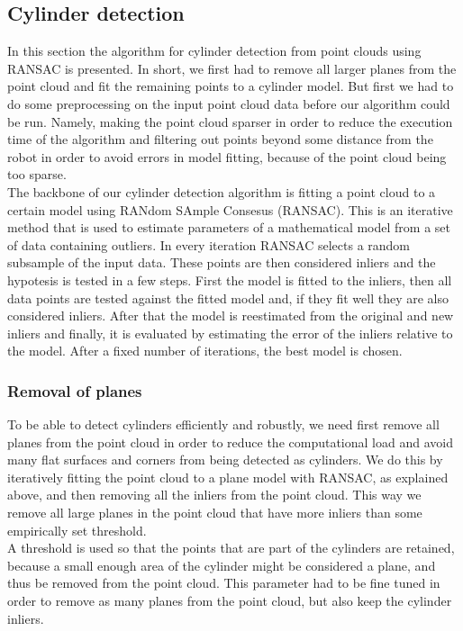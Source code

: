 \documentclass[12pt,a4paper]{article}
\begin{document}
	\subsection{Cylinder detection}
	In this section the algorithm for cylinder detection from point clouds using RANSAC is presented. In short, we first had to remove all larger planes from the point cloud and fit the remaining points to a cylinder model. But first we had to do some preprocessing on the input point cloud data before our algorithm could be run. Namely, making the point cloud sparser in order to reduce the execution time of the algorithm and filtering out points beyond some distance from the robot in order to avoid errors in model fitting, because of the point cloud being too sparse. \\

	The backbone of our cylinder detection algorithm is fitting a point cloud to a certain model using RANdom SAmple Consesus (RANSAC). This is an iterative method that is used to estimate parameters of a mathematical model from a set of data containing outliers. In every iteration RANSAC selects a random subsample of the input data. These points are then considered inliers and the hypotesis is tested in a few steps. First the model is fitted to the inliers, then all data points are tested against the fitted model and, if they fit well they are also considered inliers. After that the model is reestimated from the original and new inliers and finally, it is evaluated by estimating the error of the inliers relative to the model. After a fixed number of iterations, the best model is chosen. \\
	
	\subsubsection{Removal of planes}
	To be able to detect cylinders efficiently and robustly, we need first remove all planes from the point cloud in order to reduce the computational load and avoid many flat surfaces and corners from being detected as cylinders. We do this by iteratively fitting the point cloud to a plane model with RANSAC, as explained above, and then removing all the inliers from the point cloud. This way we remove all large planes in the point cloud that have more inliers than some empirically set threshold. \\
	
	A threshold is used so that the points that are part of the cylinders are retained, because a small enough area of the cylinder might be considered a plane, and thus be removed from the point cloud. This parameter had to be fine tuned in order to remove as many planes from the point cloud, but also keep the cylinder inliers. \\
\end{document}
